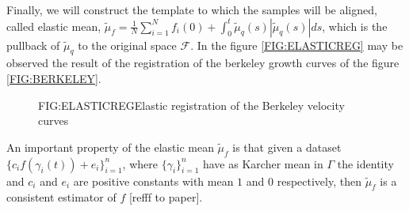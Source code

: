 Finally, we will construct the template to which the samples will be aligned,
called elastic mean,
$\tilde \mu_f = \frac{1}{N} \sum_{i=1}^N f_i(0) +
\int_0^t \tilde \mu_q(s) | \tilde \mu_q(s)| ds$,
which is the pullback of $\tilde \mu_q$ to the original space $\mathscr{F}$. In
the figure \ref{FIG:ELASTICREG} may be observed the result of the registration of the
berkeley growth curves of the figure \ref{FIG:BERKELEY}.

\begin{figure}[Elastic registration of the Berkeley velocity curves]{FIG:ELASTICREG}{Elastic registration of the Berkeley velocity curves}
\end{figure}

An important property of the elastic mean
$\tilde \mu_f$ is that given a dataset $\{c_i f(\gamma_i(t)) + e_i\}_{i=1}^{n}$, where
$\{\gamma_i\}_{i=1}^{n}$ have as Karcher mean in $\Gamma$ the identity and $c_i$ and $e_i$ are positive
constants with mean $1$ and $0$ respectively, then $\tilde \mu_f$ is a
consistent estimator of $f$ [refff to paper].
